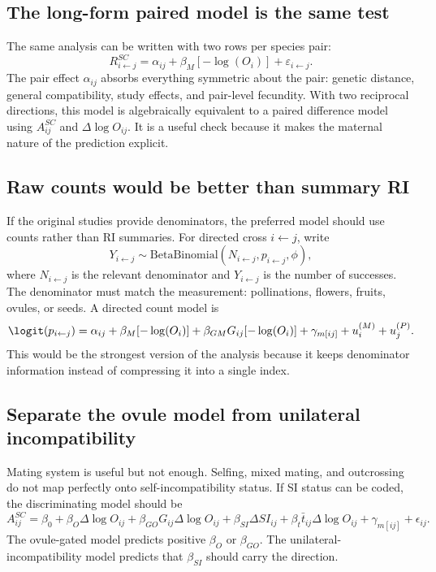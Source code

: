 \subsection{The long-form paired model is the same test}

The same analysis can be written with two rows per species pair:
\begin{equation}
R^{SC}_{i\leftarrow j}=\alpha_{ij}+\beta_M[-\log(O_i)]+\varepsilon_{i\leftarrow j}.
\label{eq:long-pair-analysis}
\end{equation}
The pair effect $\alpha_{ij}$ absorbs everything symmetric about the pair: genetic distance, general compatibility, study effects, and pair-level fecundity. With two reciprocal directions, this model is algebraically equivalent to a paired difference model using $A^{SC}_{ij}$ and $\Delta\log O_{ij}$. It is a useful check because it makes the maternal nature of the prediction explicit.

\subsection{Raw counts would be better than summary RI}

If the original studies provide denominators, the preferred model should use counts rather than RI summaries. For directed cross $i\leftarrow j$, write
\begin{equation}
Y_{i\leftarrow j}\sim \mathrm{BetaBinomial}(N_{i\leftarrow j},p_{i\leftarrow j},\phi),
\label{eq:raw-count-analysis}
\end{equation}
where $N_{i\leftarrow j}$ is the relevant denominator and $Y_{i\leftarrow j}$ is the number of successes. The denominator must match the measurement: pollinations, flowers, fruits, ovules, or seeds. A directed count model is
\begin{equation}
\logit(p_{i\leftarrow j})=\alpha_{ij}
+\beta_M[-\log(O_i)]
+\beta_{GM}G_{ij}[-\log(O_i)]
+\gamma_{m[ij]}+u_i^{(M)}+u_j^{(P)}.
\label{eq:raw-count-regression}
\end{equation}
This would be the strongest version of the analysis because it keeps denominator information instead of compressing it into a single index.

\subsection{Separate the ovule model from unilateral incompatibility}

Mating system is useful but not enough. Selfing, mixed mating, and outcrossing do not map perfectly onto self-incompatibility status. If SI status can be coded, the discriminating model should be
\begin{equation}
A^{SC}_{ij}=\beta_0+\beta_O\Delta\log O_{ij}
+\beta_{GO}G_{ij}\Delta\log O_{ij}
+\beta_{SI}\Delta SI_{ij}
+\beta_t\bar{t}_{ij}\Delta\log O_{ij}
+\gamma_{m[ij]}+\epsilon_{ij}.
\label{eq:SI-discriminating-analysis}
\end{equation}
The ovule-gated model predicts positive $\beta_O$ or $\beta_{GO}$. The unilateral-incompatibility model predicts that $\beta_{SI}$ should carry the direction.

